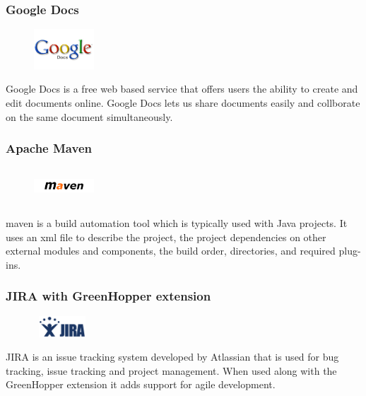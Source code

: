 \subsubsection{Google Docs}
\begin{figure}
  \vspace{-115pt}
  \begin{center}
    \includegraphics[width=0.2\textwidth]{GoogleDocs}
  \end{center}

\end{figure}
Google Docs is a free web based service that offers users the ability to create and edit documents online. Google Docs lets us share documents easily  and \newline collborate on the same document simultaneously.	

\subsubsection{Apache Maven}
\begin{figure}
  \vspace{-35pt}
  \begin{center}
    \includegraphics[width=0.2\textwidth, height=50px]{Maven}
  \end{center}

\end{figure}
\gls{maven} is a build automation tool which is typically used with Java projects. It uses an \gls{xml} file to describe the project, the project dependencies on other external modules and components, the build order, directories, and required plug-ins.   

\subsubsection{JIRA with GreenHopper extension}
\begin{figure}
  \vspace{-40pt}
  \begin{center}
    \includegraphics[width=80px,height=30px]{Jira}
  \end{center}

\end{figure}
JIRA is an issue tracking system developed by Atlassian that is used for bug tracking, issue tracking and project management. When used along with the GreenHopper extension it adds support for agile development.

